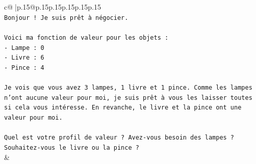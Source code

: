 \documentclass{article}
\begin{document}
{\begin{supertabular}{c@{$\;$}|p{.15\linewidth}@{}p{.15\linewidth}p{.15\linewidth}p{.15\linewidth}p{.15\linewidth}p{.15\linewidth}}
{{{\\ 
\texttt{Bonjour ! Je suis prêt à négocier.} \\
\\ 
\texttt{Voici ma fonction de valeur pour les objets :} \\
\texttt{{-} Lampe : 0} \\
\texttt{{-} Livre : 6} \\
\texttt{{-} Pince : 4} \\
\\ 
\texttt{Je vois que vous avez 3 lampes, 1 livre et 1 pince. Comme les lampes n'ont aucune valeur pour moi, je suis prêt à vous les laisser toutes si cela vous intéresse. En revanche, le livre et la pince ont une valeur pour moi.} \\
\\ 
\texttt{Quel est votre profil de valeur ? Avez{-}vous besoin des lampes ? Souhaitez{-}vous le livre ou la pince ?} \\
            }
        }
    }
    & \\ \\


\end{supertabular}}
\end{document}
